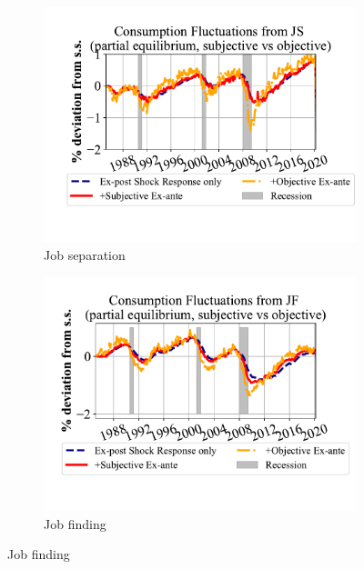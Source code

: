 \begin{figure}[ht]
    \centering
    \caption{\textbf{Monthly} Consumption Fluctuations due to Unemployment Risks}
    \label{fig:pe_decompose_sub_obj_monthly}

    \begin{subfigure}{0.32\linewidth}
         \caption*{Job separation}
        \includegraphics[width=\linewidth]{text/Chapter2/Figures/consumption_pe_JS_deviation_machine_as_rational_monthly.pdf}
   
    \end{subfigure}
    \hfill
    \begin{subfigure}{0.32\linewidth}
         \caption*{Job finding}
        \includegraphics[width=\linewidth]{text/Chapter2/Figures/consumption_pe_JF_deviation_machine_as_rational_monthly.pdf}
   

\end{subfigure}
\end{figure}
